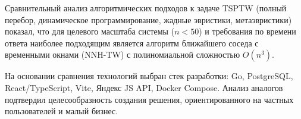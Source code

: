 Сравнительный анализ алгоритмических подходов к задаче TSPTW (полный перебор,
динамическое программирование, жадные эвристики, метаэвристики) показал, что для
целевого масштаба системы ($n < 50$) и требования по времени ответа наиболее
подходящим является алгоритм ближайшего соседа с временными окнами (NNH-TW)
с полиномиальной сложностью $O(n^3)$.

На основании сравнения технологий выбран стек разработки: Go, PostgreSQL,
React/TypeScript, Vite, Яндекс JS API, Docker Compose. Анализ аналогов
подтвердил целесообразность создания решения, ориентированного на частных
пользователей и малый бизнес.
